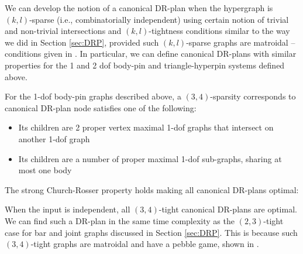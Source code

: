 We can develop the notion of a canonical DR-plan when the hypergraph is
$(k,l)$-sparse (i.e., combinatorially independent) using certain
notion of trivial and non-trivial intersections and
$(k,l)$-tightness conditions similar to the way we did in Section
\ref{sec:DRP}, provided
    such $(k,l)$-sparse graphs are matroidal -- conditions given in \cite{Lee:2007:PGA}.
    In particular, we can define canonical DR-plans with similar properties
    for the 1 and 2 dof body-pin and triangle-hyperpin systems defined
    above.

\begin{observation}
\label{obs:bodypin_drp}
    For the 1-dof body-pin graphs described above, a $(3,4)$-sparsity
    corresponds to canonical DR-plan node
    satisfies one of the following:

    \begin{itemize}
        \item Its children  are 2 proper vertex maximal 1-dof graphs that intersect on
            another 1-dof graph
        \item Its children are a number of proper maximal 1-dof sub-graphs,
            sharing at most one body
    \end{itemize}
\end{observation}



The strong Church-Rosser property holds making all canonical DR-plans
optimal:
%
\begin{remark}\label{rem:1dofcanon}
    When the input is independent,
    all $(3,4)$-tight canonical DR-plans are optimal. We can find such a
    DR-plan in the same time complexity as the $(2,3)$-tight case for bar
    and joint graphs discussed in Section \ref{sec:DRP}.
    This is because
    such $(3,4)$-tight graphs are matroidal and have a pebble game, shown in \cite{Lee:2007:PGA}.
\end{remark}

